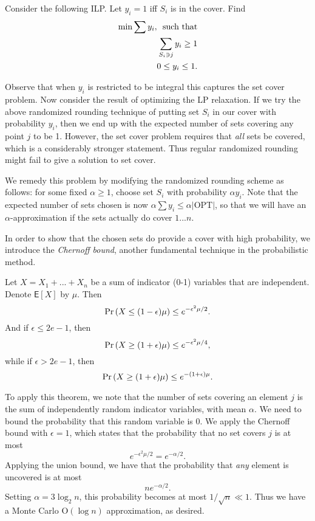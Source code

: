 \documentclass{article}
\renewcommand{\Pr}[1]{\textrm{\textup{Pr}}\left( #1 \right)}
\newcommand{\E}{\mbox{$\mathsf E$}}
\begin{document}
Consider the following ILP.  Let $y_i=1$ iff $S_i$ is in the cover.  Find
\begin{align}
\min\sum{y_i}, \textrm{\enspace such that}\\
\sum_{S_i\ni j}y_i\geq 1\\
0\leq y_i\leq 1.
\end{align}

Observe that when $y_i$ is restricted to be integral this captures the set cover problem.  Now consider the result of optimizing the LP relaxation.  If we try the above randomized rounding technique of putting set $S_i$ in our cover with probability $y_i$, then we end up with the expected number of sets covering any point $j$ to be 1.  However, the set cover problem requires that \emph{all} sets be covered, which is a considerably stronger statement.  Thus regular randomized rounding might fail to give a solution to set cover.

We remedy this problem by modifying the randomized rounding scheme as follows: for some fixed $\alpha\geq 1$, choose set $S_i$ with probability $\alpha y_i$.  Note that the expected number of sets chosen is now $\alpha\sum y_i\leq \alpha |\textrm{OPT}|$, so that we will have an $\alpha$-approximation if the sets actually do cover $1...n$.

In order to show that the chosen sets do provide a cover with high probability, we introduce the \emph{Chernoff bound}, another fundamental technique in the probabilistic method.

\begin{theorem}
Let $X=X_1+...+X_n$ be a sum of indicator (0-1) variables that are independent.  Denote $\E[X]$ by $\mu$.  Then $$\Pr{X\leq(1-\epsilon)\mu}\leq e^{-\epsilon^2\mu/2}.$$
And if $\epsilon\leq 2e-1$, then $$\Pr{X\geq(1+\epsilon)\mu}\leq e^{-\epsilon^2\mu/4},$$
while if $\epsilon>2e-1$, then $$\Pr{X\geq(1+\epsilon)\mu}\leq e^{-(1+\epsilon)\mu}.$$
\end{theorem}
To apply this theorem, we note that the number of sets covering an element $j$ is the sum of independently random indicator variables, with mean $\alpha$.  We need to bound the probability that this random variable is 0.  We apply the Chernoff bound with $\epsilon=1$, which states that the probability that no set covers $j$ is at most $$e^{-\epsilon^2\mu/2}=e^{-\alpha/2}.$$
Applying the union bound, we have that the probability that \emph{any} element is uncovered is at most $$ne^{-\alpha/2}.$$  Setting $\alpha=3\log_2 n$, this probability becomes at most $1/\sqrt{n}\ll 1$.  Thus we have a Monte Carlo $\textrm{O}(\log n)$ approximation, as desired.
\end{document}

